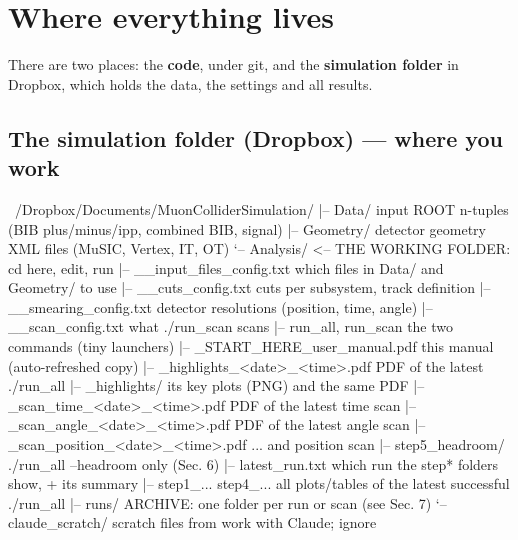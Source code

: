 \documentclass[11pt,letterpaper]{article}
\begin{document}
\section{Where everything lives}

There are two places: the \textbf{code}, under git, and the
\textbf{simulation folder} in Dropbox, which holds the data, the settings
and all results.

\subsection{The simulation folder (Dropbox) --- where you work}
\begin{tree}
~/Dropbox/Documents/MuonColliderSimulation/
|-- Data/                      input ROOT n-tuples (BIB plus/minus/ipp, combined BIB, signal)
|-- Geometry/                  detector geometry XML files (MuSIC, Vertex, IT, OT)
`-- Analysis/                  <-- THE WORKING FOLDER: cd here, edit, run
    |-- __input_files_config.txt   which files in Data/ and Geometry/ to use
    |-- __cuts_config.txt          cuts per subsystem, track definition
    |-- __smearing_config.txt      detector resolutions (position, time, angle)
    |-- __scan_config.txt          what ./run_scan scans
    |-- run_all, run_scan          the two commands (tiny launchers)
    |-- _START_HERE_user_manual.pdf    this manual (auto-refreshed copy)
    |-- _highlights_<date>_<time>.pdf   PDF of the latest ./run_all
    |-- _highlights/                    its key plots (PNG) and the same PDF
    |-- _scan_time_<date>_<time>.pdf    PDF of the latest time scan
    |-- _scan_angle_<date>_<time>.pdf   PDF of the latest angle scan
    |-- _scan_position_<date>_<time>.pdf  ... and position scan
    |-- step5_headroom/            ./run_all --headroom only (Sec. 6)
    |-- latest_run.txt             which run the step* folders show, + its summary
    |-- step1_... step4_...        all plots/tables of the latest successful ./run_all
    |-- runs/                      ARCHIVE: one folder per run or scan (see Sec. 7)
    `-- claude_scratch/            scratch files from work with Claude; ignore
\end{tree}
\end{document}
